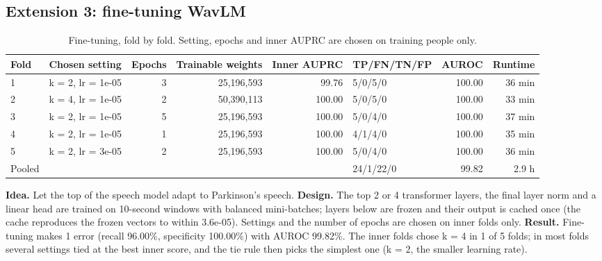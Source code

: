 \documentclass[11pt,a4paper]{article}
\begin{document}
\subsection{Extension 3: fine-tuning WavLM}\label{sec:ext3}
\begin{table}[H]\centering\footnotesize\renewcommand{\arraystretch}{1.15}
\caption{Fine-tuning, fold by fold. Setting, epochs and inner AUPRC are chosen on training people only.}
\begin{adjustbox}{max width=\linewidth}\begin{tabular}{llrrrlrr}
\toprule
\textbf{Fold} & \textbf{Chosen setting} & \textbf{Epochs} & \textbf{Trainable weights} & \textbf{Inner AUPRC} & \textbf{TP/FN/TN/FP} & \textbf{AUROC} & \textbf{Runtime}\\
\midrule
1 & k = 2, lr = 1e-05 & 3 & 25,196,593 & 99.76 & 5/0/5/0 & 100.00 & 36 min\\
2 & k = 4, lr = 1e-05 & 2 & 50,390,113 & 100.00 & 5/0/5/0 & 100.00 & 33 min\\
3 & k = 2, lr = 1e-05 & 5 & 25,196,593 & 100.00 & 5/0/4/0 & 100.00 & 37 min\\
4 & k = 2, lr = 1e-05 & 1 & 25,196,593 & 100.00 & 4/1/4/0 & 100.00 & 35 min\\
5 & k = 2, lr = 3e-05 & 2 & 25,196,593 & 100.00 & 5/0/4/0 & 100.00 & 36 min\\
Pooled &  &  &  &  & 24/1/22/0 & 99.82 & 2.9 h\\
\bottomrule
\end{tabular}\end{adjustbox}\end{table}
\textbf{Idea.} Let the top of the speech model adapt to Parkinson's speech. \textbf{Design.} The top 2 or 4 transformer layers, the final layer norm and a linear head are trained on 10-second windows with balanced mini-batches; layers below are frozen and their output is cached once (the cache reproduces the frozen vectors to within 3.6e-05). Settings and the number of epochs are chosen on inner folds only. \textbf{Result.} Fine-tuning makes 1 error (recall 96.00\%, specificity 100.00\%) with AUROC 99.82\%. The inner folds chose k = 4 in 1 of 5 folds; in most folds several settings tied at the best inner score, and the tie rule then picks the simplest one (k = 2, the smaller learning rate).
\end{document}

